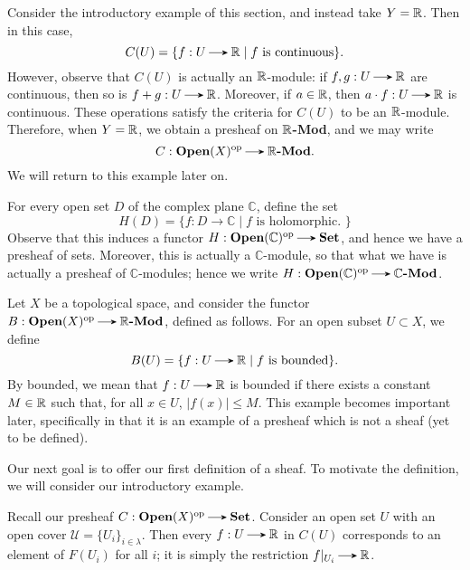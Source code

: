 \begin{example}
    Consider the introductory example of this section, and instead take $Y = \mathbb{R}$. 
    Then in this case, 
    \[
        C(U) = \{f: U \to \rr \mid f \text{ is continuous}\}.
    \]
    However, observe that $C(U)$ is actually an $\mathbb{R}$-module: 
    if $f, g: U \to \rr$ are continuous, then so is $f + g: U \to \rr$. Moreover, 
    if $a \in \mathbb{R}$, then $a\cdot f: U \to \rr$ is continuous. These operations 
    satisfy the criteria for $C(U)$ to be an $\mathbb{R}$-module. Therefore, when $Y = \mathbb{R}$, 
    we obtain a presheaf on \textbf{$\mathbb{R}$-Mod}, and we may write
    \[
        C: \textbf{Open}(X)\op \to \textbf{$\rr$-Mod}.
    \]
    We will return to this example later on.
\end{example}

\begin{example}
    For every open set $D$ of the complex plane $\mathbb{C}$, define the 
    set 
    \[
        H(D) = \{f: D \to \mathbb{C} \mid f \text{ is holomorphic. }\}
    \]
    Observe that this induces a functor $H: \textbf{Open}(\mathbb{C})\op \to \textbf{Set}$, 
    and hence we have a presheaf of sets. Moreover, this is actually a $\mathbb{C}$-module, so 
    that what we have is actually a presheaf of $\mathbb{C}$-modules; hence we 
    write $H: \textbf{Open}(\mathbb{C})\op \to \mathbb{C}\textbf{-Mod}$.
\end{example}

\begin{example}
    Let $X$ be a topological space, and consider the functor $B: \textbf{Open}(X)\op \to \textbf{$\rr$-Mod}$, 
    defined as follows. For an open subset $U \subset X$, we define 
    \[
        B(U) = \{f: U \to \rr \mid f \text{ is bounded}\}.
    \]
    By bounded, we mean that $f: U \to \rr$ is bounded if there exists a constant 
    $M \in \mathbb{R}$ such that, for all $x \in U$, $|f(x)| \le M$. 
    This example becomes important later, specifically in that it is an example 
    of a presheaf which is not a sheaf (yet to be defined). 
\end{example}

Our next goal is to offer our first definition of a sheaf. To motivate the definition, we will 
consider our introductory example. 

Recall our presheaf $C: \textbf{Open}(X)\op \to \textbf{Set}$. Consider an open set 
$U$ with an open cover $\mathcal{U} = \{U_i\}_{i \in \lambda}$. Then every 
$f: U \to \rr$ in $C(U)$ corresponds to an element of $F(U_i)$ for all $i$; it is simply 
the restriction $f|_{U_i} \to \rr$. 

